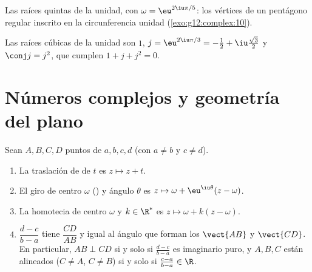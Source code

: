 \begin{omfigure}

{\small Las raíces quintas de la unidad, con $\omega = \eu^{2\iu\pi/5}$:
los vértices de un pentágono regular inscrito en la circunferencia unidad
(\cref{exo:g12:complex:10}).}
\end{omfigure}

\begin{example}
Las raíces cúbicas de la unidad son $1$,
$j = \eu^{2\iu\pi/3} = -\frac12 + \iu\frac{\sqrt3}{2}$ y
$\conj j = j^2$, que cumplen $1 + j + j^2 = 0$.
\end{example}

\section{Números complejos y geometría del plano}

\begin{proposition}\label{prop:g12:complex:geometry}
Sean $A, B, C, D$ puntos de  $a, b, c, d$ (con $a \neq b$ y
$c \neq d$).
\begin{enumerate}
  \item La traslación de  de  $t$ es $z \mapsto z + t$.
  \item El giro de centro $\omega$ () y ángulo $\theta$ es
        $z \mapsto \omega + \eu^{\iu\theta}(z - \omega)$.
  \item La homotecia de centro $\omega$ y  $k \in \R^*$ es
        $z \mapsto \omega + k(z - \omega)$.
  \item $\dfrac{d - c}{b - a}$ tiene  $\dfrac{CD}{AB}$ y 
        igual al ángulo que forman los  $\vect{AB}$ y $\vect{CD}$.
        En particular, $AB \perp CD$ si y solo si $\frac{d-c}{b-a}$ es
        imaginario puro, y $A, B, C$ están alineados ($C \ne A$,
        $C\ne B$) si y solo si $\frac{c-a}{b-a} \in \R$.
\end{enumerate}
\end{proposition}

